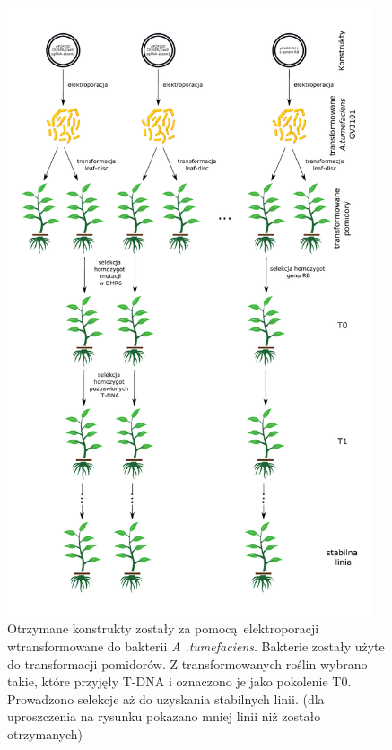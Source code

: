 \documentclass[two column, twoside, a4paper]{article}
\begin{document}
\begin{figure}[tp]
\begin{tcolorbox}
	\centering
	\includegraphics[width=0.96\textwidth]{./figures/scheme.pdf}
	\vspace{-2em}
	\caption{Otrzymane konstrukty zostały za pomocą elektroporacji wtransformowane do bakterii \textit{A .tumefaciens}. Bakterie zostały użyte do transformacji pomidorów. Z transformowanych roślin wybrano takie, które przyjęły T-DNA i oznaczono je jako pokolenie T0. Prowadzono selekcje aż do uzyskania stabilnych linii. (dla uproszczenia na rysunku pokazano mniej linii niż zostało otrzymanych)}
\end{tcolorbox}
\end{figure}
\end{document}
